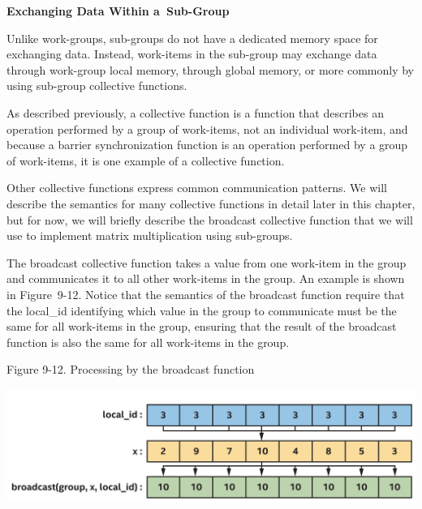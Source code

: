 \hspace*{\fill} \par %
\textbf{Exchanging Data Within a Sub-Group}

Unlike work-groups, sub-groups do not have a dedicated memory space for exchanging data. Instead, work-items in the sub-group may exchange data through work-group local memory, through global memory, or more commonly by using sub-group collective functions.\par

As described previously, a collective function is a function that describes an operation performed by a group of work-items, not an individual work-item, and because a barrier synchronization function is an operation performed by a group of work-items, it is one example of a collective function.\par

Other collective functions express common communication patterns. We will describe the semantics for many collective functions in detail later in this chapter, but for now, we will briefly describe the broadcast collective function that we will use to implement matrix multiplication using sub-groups.\par

The broadcast collective function takes a value from one work-item in the group and communicates it to all other work-items in the group. An example is shown in Figure 9-12. Notice that the semantics of the broadcast function require that the local\_id identifying which value in the group to communicate must be the same for all work-items in the group, ensuring that the result of the broadcast function is also the same for all work-items in the group.\par

\hspace*{\fill} \par %
Figure 9-12. Processing by the broadcast function
\begin{center}
	\includegraphics[width=1.\textwidth]{content/chapter-9/images/7}
\end{center}


